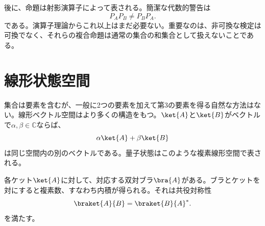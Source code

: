 \begin{classroomqa}
\end{classroomqa}

\begin{classroomqa}
\end{classroomqa}

後に、命題は射影演算子によって表される。簡潔な代数的警告は
\begin{equation}
P_A P_B\ne P_B P_A.
\end{equation}
である。演算子理論からこれ以上はまだ必要ない。重要なのは、非可換な検定は可換でなく、それらの複合命題は通常の集合の和集合として扱えないことである。

\begin{classroomqa}
\end{classroomqa}

\section{線形状態空間}

集合は要素を含むが、一般に2つの要素を加えて第3の要素を得る自然な方法はない。線形ベクトル空間はより多くの構造をもつ。\(\ket{A}\)と\(\ket{B}\)がベクトルで\(\alpha,\beta\in\mathbb C\)ならば、
\begin{equation}
\alpha\ket{A}+\beta\ket{B}
\end{equation}
は同じ空間内の別のベクトルである。量子状態はこのような複素線形空間で表される。

各ケット\(\ket{A}\)に対して、対応する双対ブラ\(\bra{A}\)がある。ブラとケットを対にすると複素数、すなわち内積が得られる。それは共役対称性
\begin{equation}
\braket{A}{B}=\braket{B}{A}^{*}.
\label{eq:conjugate-symmetry}
\end{equation}
を満たす。

